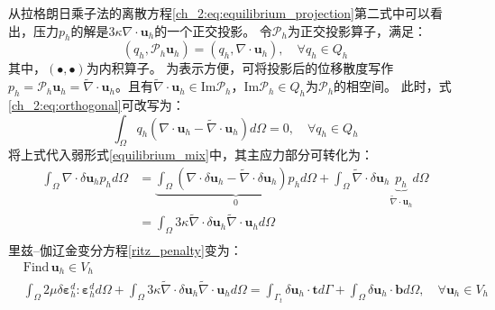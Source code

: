 从拉格朗日乘子法的离散方程\eqref{ch_2:eq:equilibrium_projection}第二式中可以看出，压力$p_h$的解是$3\kappa \nabla \cdot \boldsymbol u_h$的一个正交投影。
令$\mathcal P_h$为正交投影算子，满足：
\begin{equation}\label{ch_2:eq:orthogonal}
    (q_h,\mathcal P_h \boldsymbol u_h) = (q_h, \nabla \cdot \boldsymbol u_h), \quad \forall q_h \in Q_h
\end{equation}
其中，$(\bullet,\bullet)$为内积算子。
为表示方便，可将投影后的位移散度写作$p_h=\mathcal P_h \boldsymbol u_h = \tilde \nabla \cdot \boldsymbol u_h$。且有$\tilde \nabla \cdot \boldsymbol u_h \in \mathrm{Im} \mathcal P_h$，$\mathrm{Im} \mathcal P_h \in Q_h$为$\mathcal P_h$的相空间\cite{philippeg.2013}。
此时，式\eqref{ch_2:eq:orthogonal}可改写为：
\begin{equation}
    \int_\Omega q_h(\nabla \cdot \boldsymbol u_h - \tilde \nabla \cdot \boldsymbol u_h) d\Omega = 0, \quad \forall q_h \in Q_h
\end{equation}
将上式代入弱形式\eqref{equilibrium_mix}中，其主应力部分可转化为：
\begin{equation}\label{projection_mixed}
    \begin{split}
        \int_\Omega \nabla \cdot \delta \boldsymbol u_h p_h d\Omega &= \underbrace{\int_\Omega (\nabla \cdot \delta  \boldsymbol u_h - \tilde \nabla \cdot \delta \boldsymbol u_h) p_h d\Omega}_0 + \int_\Omega \tilde \nabla \cdot \delta \boldsymbol u_h \underbrace{p_h}_{\tilde \nabla \cdot \boldsymbol u_h} d\Omega \\
        &= \int_\Omega 3\kappa \tilde \nabla \cdot \delta \boldsymbol u_h \tilde \nabla \cdot \boldsymbol u_h d\Omega \\
    \end{split}
\end{equation}
里兹--伽辽金变分方程\eqref{ritz_penalty}变为：
\begin{equation}\label{ch_2:eq:ritz_mix}
    \begin{split}
        &\text{Find} \,\boldsymbol u_h \in V_h\\
    &\int_\Omega 2\mu \delta \boldsymbol \varepsilon^d_h : \boldsymbol \varepsilon^d_h d\Omega +
    \int_\Omega 3\kappa \tilde \nabla \cdot \delta \boldsymbol u_h \tilde \nabla \cdot \boldsymbol u_h d\Omega =
    \int_{\Gamma_t} \delta \boldsymbol u_h \cdot \boldsymbol t d\Gamma + \int_\Omega \delta \boldsymbol u_h \cdot \boldsymbol b d\Omega, \quad \forall \boldsymbol u_h \in V_h
    \end{split}
\end{equation}

